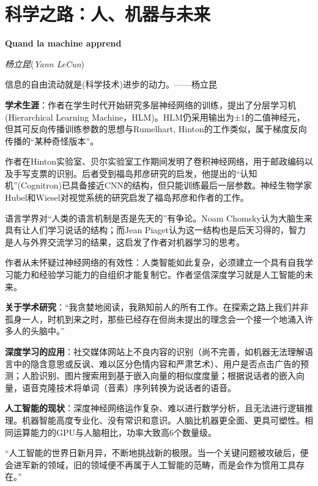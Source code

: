\chapter{科学之路：人、机器与未来}
\Large\textbf{Quand la machine apprend}
\par \emph{杨立昆}(\emph{Yann LeCun}) \normalsize

\par 信息的自由流动就是(科学技术)进步的动力。——杨立昆

\par \textbf{学术生涯}：作者在学生时代开始研究多层神经网络的训练，提出了分层学习机 (Hierarchical Learning Machine，HLM)。HLM仍采用输出为±1的二值神经元，但其可反向传播训练参数的思想与Rumelhart, Hinton的工作类似，属于梯度反向传播的“某种奇怪版本”。
\par 作者在Hinton实验室、贝尔实验室工作期间发明了卷积神经网络，用于邮政编码以及手写支票的识别。后者受到福岛邦彦研究的启发，他提出的“认知机”(Cognitron)已具备接近CNN的结构，但只能训练最后一层参数。神经生物学家Hubel和Wiesel对视觉系统的研究启发了福岛邦彦和作者的工作。
\par 语言学界对“人类的语言机制是否是先天的”有争论。Noam Chomsky认为大脑生来具有让人们学习说话的结构；而Jean Piaget认为这一结构也是后天习得的，智力是人与外界交流学习的结果，这启发了作者对机器学习的思考。
\par 作者从未怀疑过神经网络的有效性：人类智能如此复杂，必须建立一个具有自我学习能力和经验学习能力的自组织才能复制它。作者坚信深度学习就是人工智能的未来。

\par \textbf{关于学术研究}：“我贪婪地阅读，我熟知前人的所有工作。在探索之路上我们并非孤身一人，时机到来之时，那些已经存在但尚未提出的理念会一个接一个地涌入许多人的头脑中。”

\par \textbf{深度学习的应用}：社交媒体网站上不良内容的识别（尚不完善，如机器无法理解语言中的隐含意思或反讽、难以区分色情内容和严肃艺术）、用户是否点击广告的预测；人脸识别、图片搜索用到基于嵌入向量的相似度度量；根据说话者的嵌入向量，语音克隆技术将单词（音素）序列转换为说话者的语音。

\par \textbf{人工智能的现状}：深度神经网络运作复杂、难以进行数学分析，且无法进行逻辑推理。机器智能高度专业化、没有常识和意识。人脑比机器更全面、更具可塑性。相同运算能力的GPU与人脑相比，功率大致高6个数量级。
\par “人工智能的世界日新月异，不断地挑战新的极限。当一个关键问题被攻破后，便会进军新的领域，旧的领域便不再属于人工智能的范畴，而是会作为惯用工具存在。”

